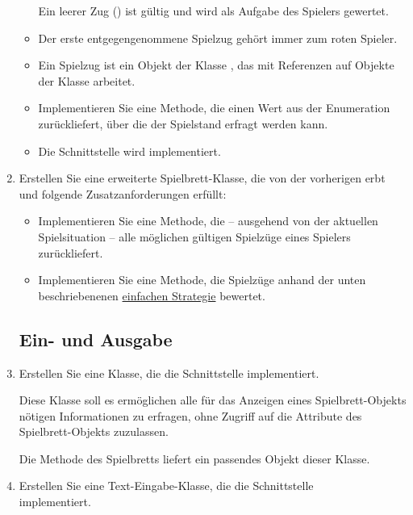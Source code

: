 \begin{enumerate}
\begin{itemize}
Ein leerer Zug () ist gültig und wird als Aufgabe des Spielers gewertet.
\item Der erste entgegengenommene Spielzug gehört immer zum roten Spieler.
\item Ein Spielzug ist ein Objekt der Klasse , das mit Referenzen auf Objekte der Klasse  arbeitet.

\item Implementieren Sie eine Methode, die einen Wert aus der Enumeration\\  zurückliefert, über die der Spielstand erfragt werden kann.

\item Die Schnittstelle  wird implementiert.
\end{itemize}

\item Erstellen Sie eine erweiterte Spielbrett-Klasse, die von der vorherigen erbt und folgende Zusatzanforderungen erfüllt:

\begin{itemize}
\item Implementieren Sie eine Methode, die -- ausgehend von der aktuellen Spielsituation -- alle möglichen gültigen Spielzüge eines Spielers zurückliefert.

\item Implementieren Sie eine Methode, die Spielzüge anhand der unten beschriebenenen \hyperlink{strategy}{einfachen Strategie} bewertet.
\end{itemize}

\subsection*{Ein- und Ausgabe}

\item Erstellen Sie eine Klasse, die die Schnittstelle  implementiert.

Diese Klasse soll es ermöglichen alle für das Anzeigen eines Spielbrett-Objekts nötigen Informationen zu erfragen, ohne Zugriff auf die Attribute des Spielbrett-Objekts zuzulassen.

Die Methode  des Spielbretts liefert ein passendes Objekt dieser Klasse.

\item Erstellen Sie eine Text-Eingabe-Klasse, die die Schnittstelle \\  implementiert.


\end{enumerate}
